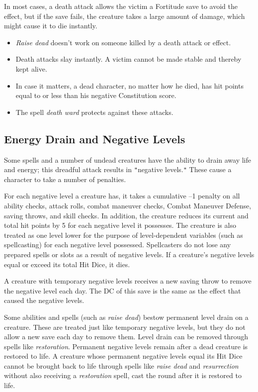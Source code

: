 				
In most cases, a death attack allows the victim a Fortitude save to avoid the effect, but if the save fails, the creature takes a large amount of damage, which might cause it to die instantly.
				\begin{itemize}\item  \textit{Raise dead }doesn't work on someone killed by a death attack or effect.
				\item  Death attacks slay instantly. A victim cannot be made stable and thereby kept alive.
				\item  In case it matters, a dead character, no matter how he died, has hit points equal to or less than his negative Constitution score.
				\item  The spell \textit{death ward }protects against these attacks.
\end{itemize}
				
\subsection{Energy Drain and Negative Levels}

				
Some spells and a number of undead creatures have the ability to drain away life and energy; this dreadful attack results in \texttt{{}"{}}negative levels.\texttt{{}"{}} These cause a character to take a number of penalties.
				
For each negative level a creature has, it takes a cumulative --1 penalty on all ability checks, attack rolls, combat maneuver checks, Combat Maneuver Defense, saving throws, and skill checks. In addition, the creature reduces its current and total hit points by 5 for each negative level it possesses. The creature is also treated as one level lower for the purpose of level-dependent variables (such as spellcasting) for each negative level possessed. Spellcasters do not lose any prepared spells or slots as a result of negative levels. If a creature's negative levels equal or exceed its total Hit Dice, it dies.
				
A creature with temporary negative levels receives a new saving throw to remove the negative level each day. The DC of this save is the same as the effect that caused the negative levels.
				
Some abilities and spells (such as \textit{raise dead}) bestow permanent level drain on a creature. These are treated just like temporary negative levels, but they do not allow a new save each day to remove them. Level drain can be removed through spells like \textit{restoration}. Permanent negative levels remain after a dead creature is restored to life. A creature whose permanent negative levels equal its Hit Dice cannot be brought back to life through spells like \textit{raise dead} and \textit{resurrection} without also receiving a \textit{restoration }spell, cast the round after it is restored to life.
				
